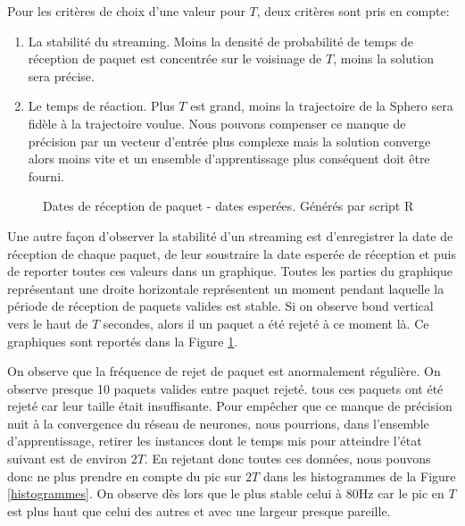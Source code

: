 Pour les critères de choix d'une valeur pour $T$, deux critères sont pris en compte:
\begin{enumerate}
 \item La stabilité du streaming. Moins la densité de probabilité de temps de réception de paquet est concentrée sur le voisinage de $T$, moins la solution sera précise.
 \item Le temps de réaction. Plus $T$ est grand, moins la trajectoire de la Sphero sera fidèle à la trajectoire voulue.
 Nous pouvons compenser ce manque de précision par un vecteur d'entrée plus complexe mais la solution converge alors moins vite et un ensemble d'apprentissage plus conséquent doit être fourni.
\end{enumerate}

\begin{figure}
 \centering
 \caption{Dates de réception de paquet - dates esperées. Générés par script R}
 \label{befores}
\end{figure}
Une autre façon d'observer la stabilité d'un streaming est d'enregistrer la date de réception de chaque paquet, de leur soustraire la date esperée de réception et puis de reporter toutes ces valeurs dans un graphique.
Toutes les parties du graphique représentant une droite horizontale représentent un moment pendant laquelle la période de réception de paquets valides est stable.
Si on observe bond vertical vers le haut de $T$ secondes, alors il un paquet a été rejeté à ce moment là.
Ce graphiques sont reportés dans la Figure \ref{befores}.

On observe que la fréquence de rejet de paquet est anormalement régulière.
On observe presque 10 paquets valides entre paquet rejeté.
tous ces paquets ont été rejeté car leur taille était insuffisante.
Pour empêcher que ce manque de précision nuit à la convergence du réseau de neurones, nous pourrions, dans l'ensemble d'apprentissage, retirer les instances dont le temps mis pour atteindre l'état suivant est de environ $2T$.
En rejetant donc toutes ces données, nous pouvons donc ne plus prendre en compte du pic sur $2T$ dans les histogrammes de la Figure \ref{histogrammes}.
On observe dès lors que le plus stable celui à 80Hz car le pic en $T$ est plus haut que celui des autres et avec une largeur presque pareille.